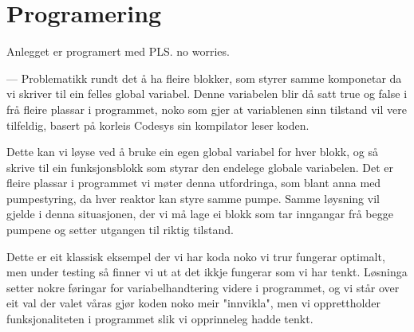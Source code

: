 \chapter{Programering}
\thispagestyle{fancy}
Anlegget er programert med PLS. no worries.

---
Problematikk rundt det å ha fleire blokker, som styrer samme komponetar da vi skriver til ein felles global variabel.
Denne variabelen blir då satt true og false i frå fleire plassar i programmet, noko som gjer at variablenen sinn tilstand vil vere tilfeldig, basert på korleis Codesys sin kompilator leser koden.

Dette kan vi løyse ved å bruke ein egen global variabel for hver blokk, og så skrive til ein funksjonsblokk som styrar den endelege globale variabelen.
Det er fleire plassar i programmet vi møter denna utfordringa, som blant anna med pumpestyring, da hver reaktor kan styre samme pumpe.
Samme løysning vil gjelde i denna situasjonen, der vi må lage ei blokk som tar inngangar frå begge pumpene og setter utgangen til riktig tilstand.

Dette er eit klassisk eksempel der vi har koda noko vi trur fungerar optimalt, men under testing så finner vi ut at det ikkje fungerar som vi har tenkt.
Løsninga setter nokre føringar for variabelhandtering videre i programmet, og vi står over eit val der valet våras gjør koden noko meir "innvikla", men vi opprettholder
funksjonaliteten i programmet slik vi opprinneleg hadde tenkt.